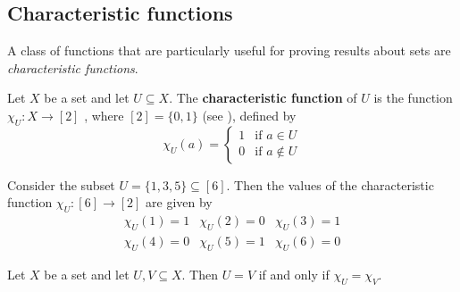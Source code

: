 \subsection*{Characteristic functions}

A class of functions that are particularly useful for proving results about sets are \textit{characteristic functions}.

\begin{definition}
\label{defCharacteristicFunction}
Let $X$ be a set and let $U \subseteq X$. The \textbf{characteristic function} of $U$ is the function $\chi_U : X \to [2]$ , where $[2] = \{ 0, 1 \}$ (see ), defined by
\[ \chi_U(a) = \begin{cases} 1 & \text{if } a \in U \\ 0 & \text{if } a \not\in U \end{cases} \]
\end{definition}

\begin{example}
Consider the subset $U = \{ 1,3,5 \} \subseteq [6]$. Then the values of the characteristic function $\chi_U : [6] \to [2]$ are given by
\[ \begin{matrix} \chi_U(1) = 1 & \chi_U(2) = 0 & \chi_U(3) = 1 \\ \chi_U(4) = 0 & \chi_U(5) = 1 & \chi_U(6) = 0 \end{matrix} \]
\end{example}

\begin{theorem}
\label{thmCharacteristicFunctionsCharacteriseSubsets}
Let $X$ be a set and let $U, V \subseteq X$. Then $U=V$ if and only if $\chi_U = \chi_V$.
\end{theorem}

